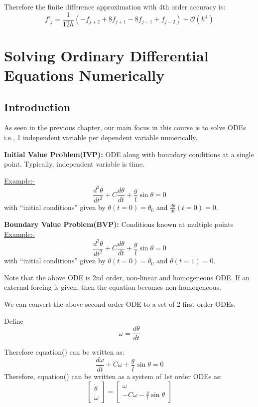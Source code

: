 \documentclass[
]{book}
\begin{document}
Therefore the finite difference approximation with 4th order accuracy is:
\begin{equation}
f'_j = \frac{1}{12h}(-f_{j+2}+8f_{j+1}-8f_{j-1}+f_{j-2}) + \mathcal{O}(h^4)
\end{equation}

\hypertarget{solving-ordinary-differential-equations-numerically}{%
\chapter{Solving Ordinary Differential Equations Numerically}\label{solving-ordinary-differential-equations-numerically}}

\hypertarget{introduction-2}{%
\section{Introduction}\label{introduction-2}}

As seen in the previous chapter, our main focus in this course is to solve ODEs i.e., 1 independent variable per dependent variable numerically.

\textbf{Initial Value Problem(IVP):} ODE along with boundary conditions at a single point. Typically, independent variable is time.

\url{Example:-}
\begin{equation}
    \frac{d^2\theta}{dt^2}+C\frac{d\theta}{dt}+\frac{g}{l}\sin \theta = 0
\end{equation}
with ``initial conditions'' given by \(\theta(t=0)= \theta_0\) and \(\frac{d\theta}{dt}(t=0) = 0\).

\textbf{Boundary Value Problem(BVP):} Conditions known at multiple points
\url{Example:-}
\begin{equation}
    \frac{d^2\theta}{dt^2}+C\frac{d\theta}{dt}+\frac{g}{l}\sin \theta = 0
\end{equation}
with ``initial conditions'' given by \(\theta(t=0)= \theta_0\) and \(\theta(t=1) = 0\).

Note that the above ODE is 2nd order, non-linear and homogeneous ODE. If an external forcing is given, then the equation becomes non-homogeneous.

We can convert the above second order ODE to a set of 2 first order ODEs.

Define \[\omega = \frac{d\theta}{dt}\]

Therefore equation() can be written as:
\[\frac{d\omega}{dt}+C \omega+\frac{g}{l}\sin \theta = 0\]
Therefore, equation() can be written as a system of 1st order ODEs as:
\begin{equation}
\begin{bmatrix} \dot{\theta} \\  \dot{\omega} \end{bmatrix}=\begin{bmatrix} \omega \\  -C \omega-\frac{g}{l}\sin \theta \end{bmatrix}
\end{equation}
\end{document}

